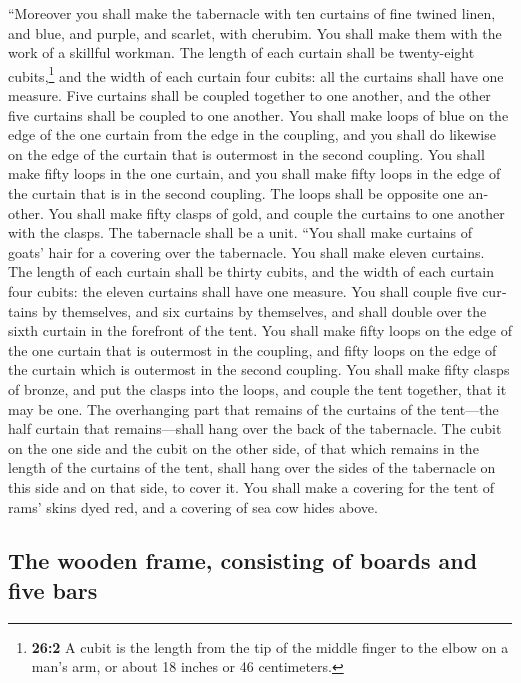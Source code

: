 \begin{paracol}{2}
\begin{otherlanguage}{english}
 ``Moreover you shall make the tabernacle with ten
curtains of fine twined linen, and blue, and purple, and scarlet, with
cherubim. You shall make them with the work of a skillful workman.
 The length of each curtain shall be twenty-eight
cubits,\footnote{\textbf{26:2} A cubit is the length from the tip of the
  middle finger to the elbow on a man's arm, or about 18 inches or 46
  centimeters.} and the width of each curtain four cubits: all the
curtains shall have one measure.  Five curtains shall be
coupled together to one another, and the other five curtains shall be
coupled to one another.  You shall make loops of blue on
the edge of the one curtain from the edge in the coupling, and you shall
do likewise on the edge of the curtain that is outermost in the second
coupling.  You shall make fifty loops in the one curtain,
and you shall make fifty loops in the edge of the curtain that is in the
second coupling. The loops shall be opposite one another. 
You shall make fifty clasps of gold, and couple the curtains to one
another with the clasps. The tabernacle shall be a unit. 
``You shall make curtains of goats' hair for a covering over the
tabernacle. You shall make eleven curtains.  The length of
each curtain shall be thirty cubits, and the width of each curtain four
cubits: the eleven curtains shall have one measure.  You
shall couple five curtains by themselves, and six curtains by
themselves, and shall double over the sixth curtain in the forefront of
the tent.  You shall make fifty loops on the edge of the
one curtain that is outermost in the coupling, and fifty loops on the
edge of the curtain which is outermost in the second coupling.
 You shall make fifty clasps of bronze, and put the
clasps into the loops, and couple the tent together, that it may be one.
 The overhanging part that remains of the curtains of the
tent---the half curtain that remains---shall hang over the back of the
tabernacle.  The cubit on the one side and the cubit on
the other side, of that which remains in the length of the curtains of
the tent, shall hang over the sides of the tabernacle on this side and
on that side, to cover it.  You shall make a covering for
the tent of rams' skins dyed red, and a covering of sea cow hides above.

\hypertarget{the-wooden-frame-consisting-of-boards-and-five-bars}{%
\subsection{The wooden frame, consisting of boards and five
bars}\label{the-wooden-frame-consisting-of-boards-and-five-bars}}


\end{otherlanguage}
\end{paracol}
